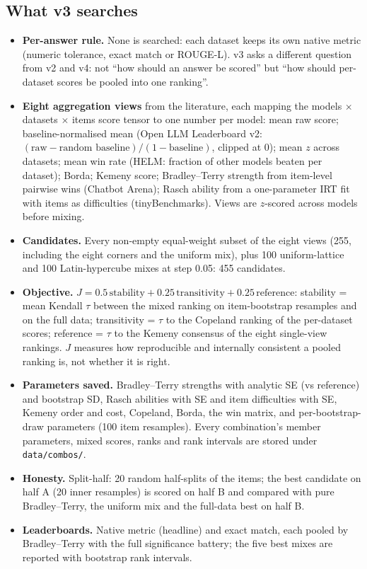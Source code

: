 \documentclass[11pt]{article}
\begin{document}
\subsection{What v3 searches}
\begin{itemize}
\item \textbf{Per-answer rule.} None is searched: each dataset keeps its own native metric (numeric tolerance, exact match or ROUGE-L). v3 asks a different question from v2 and v4: not ``how should an answer be scored'' but ``how should per-dataset scores be pooled into one ranking''.
\item \textbf{Eight aggregation views} from the literature, each mapping the models $\times$ datasets $\times$ items score tensor to one number per model: mean raw score; baseline-normalised mean (Open LLM Leaderboard v2: $(\text{raw} - \text{random baseline})/(1 - \text{baseline})$, clipped at 0); mean $z$ across datasets; mean win rate (HELM: fraction of other models beaten per dataset); Borda; Kemeny score; Bradley--Terry strength from item-level pairwise wins (Chatbot Arena); Rasch ability from a one-parameter IRT fit with items as difficulties (tinyBenchmarks). Views are $z$-scored across models before mixing.
\item \textbf{Candidates.} Every non-empty equal-weight subset of the eight views (255, including the eight corners and the uniform mix), plus 100 uniform-lattice and 100 Latin-hypercube mixes at step 0.05: 455 candidates.
\item \textbf{Objective.} $J = 0.5\,\text{stability} + 0.25\,\text{transitivity} + 0.25\,\text{reference}$: stability = mean Kendall $\tau$ between the mixed ranking on item-bootstrap resamples and on the full data; transitivity = $\tau$ to the Copeland ranking of the per-dataset scores; reference = $\tau$ to the Kemeny consensus of the eight single-view rankings. $J$ measures how reproducible and internally consistent a pooled ranking is, not whether it is right.
\item \textbf{Parameters saved.} Bradley--Terry strengths with analytic SE (vs reference) and bootstrap SD, Rasch abilities with SE and item difficulties with SE, Kemeny order and cost, Copeland, Borda, the win matrix, and per-bootstrap-draw parameters (100 item resamples). Every combination's member parameters, mixed scores, ranks and rank intervals are stored under \texttt{data/combos/}.
\item \textbf{Honesty.} Split-half: 20 random half-splits of the items; the best candidate on half A (20 inner resamples) is scored on half B and compared with pure Bradley--Terry, the uniform mix and the full-data best on half B.
\item \textbf{Leaderboards.} Native metric (headline) and exact match, each pooled by Bradley--Terry with the full significance battery; the five best mixes are reported with bootstrap rank intervals.
\end{itemize}
\end{document}
